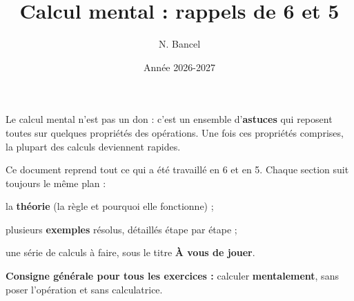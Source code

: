 \documentclass[11pt]{exam}
\title{Calcul mental : rappels de 6\up{e} et 5\up{e}}
\author{N. Bancel}
\date{Année 2026-2027}
\begin{document}
{\let\newpage\relax\maketitle}

\begin{aretenir}[title={À quoi sert ce document ?}]
Le calcul mental n'est pas un don : c'est un ensemble d'\textbf{astuces} qui reposent
toutes sur quelques propriétés des opérations. Une fois ces propriétés comprises,
la plupart des calculs deviennent rapides.

Ce document reprend tout ce qui a été travaillé en 6 et en 5. Chaque section
suit toujours le même plan :

\begin{compactitem}
\item la \textbf{théorie} (la règle et pourquoi elle fonctionne) ;
\item plusieurs \textbf{exemples} résolus, détaillés étape par étape ;
\item une série de calculs à faire, sous le titre \textbf{À vous de jouer}.
\end{compactitem}

\textbf{Consigne générale pour tous les exercices :} calculer \textbf{mentalement},
sans poser l'opération et sans calculatrice.
\end{aretenir}

\tableofcontents
\newpage


\end{document}
